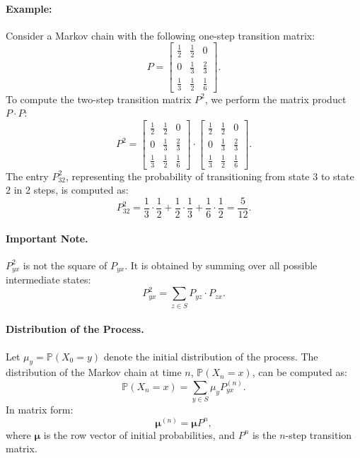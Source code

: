 \paragraph{Example:}
Consider a Markov chain with the following one-step transition matrix:
\[
P = 
\begin{bmatrix}
\frac{1}{2} & \frac{1}{2} & 0 \\
0 & \frac{1}{3} & \frac{2}{3} \\
\frac{1}{3} & \frac{1}{2} & \frac{1}{6}
\end{bmatrix}.
\]
To compute the two-step transition matrix \( P^2 \), we perform the matrix product \( P \cdot P \):
\[
P^2 = 
\begin{bmatrix}
\frac{1}{2} & \frac{1}{2} & 0 \\
0 & \frac{1}{3} & \frac{2}{3} \\
\frac{1}{3} & \frac{1}{2} & \frac{1}{6}
\end{bmatrix}
\cdot
\begin{bmatrix}
\frac{1}{2} & \frac{1}{2} & 0 \\
0 & \frac{1}{3} & \frac{2}{3} \\
\frac{1}{3} & \frac{1}{2} & \frac{1}{6}
\end{bmatrix}.
\]
The entry \( P^2_{32} \), representing the probability of transitioning from state \( 3 \) to state \( 2 \) in 2 steps, is computed as:
\[
P^2_{32} = \frac{1}{3} \cdot \frac{1}{2} + \frac{1}{2} \cdot \frac{1}{3} + \frac{1}{6} \cdot \frac{1}{2} = \frac{5}{12}.
\]

\paragraph{Important Note.}
\( P^2_{yx} \) is not the square of \( P_{yx} \). It is obtained by summing over all possible intermediate states:
\[
P^2_{yx} = \sum_{z \in S} P_{yz} \cdot P_{zx}.
\]

\paragraph{Distribution of the Process.}
Let \( \mu_y = \mathbb{P}(X_0 = y) \) denote the initial distribution of the process. The distribution of the Markov chain at time \( n \), \( \mathbb{P}(X_n = x) \), can be computed as:
\[
\mathbb{P}(X_n = x) = \sum_{y \in S} \mu_y P^{(n)}_{yx}.
\]
In matrix form:
\[
\mathbf{\mu}^{(n)} = \mathbf{\mu} P^n,
\]
where \( \mathbf{\mu} \) is the row vector of initial probabilities, and \( P^n \) is the \( n \)-step transition matrix.

